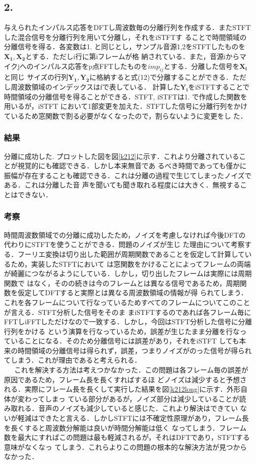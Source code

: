 \documentclass[a4j]{jarticle}
\begin{document}
\subsection{2.}
与えられたインパルス応答をDFTし周波数毎の分離行列を作成する．またSTFTした混合信号を分離行列を用いて分離し，それをiSTFTす
ることで時間領域の分離信号を得る．各変数は1. と同じとし，サンプル音源1,2をSTFTしたものを$\bm{X_1}, \bm{X_2}$とする．ただしi行に第iフレームが格
納されている．また，音源iからマイクjへのインパルス応答をp点FFTしたものを$imp_{ij}$とする．分離した信号を$\bm{X_i}$と同じ
サイズの行列$\bm{Y_1}, \bm{Y_2}$に格納すると式(12)で分離することができる．ただし周波数領域のインデックスはfで表している．
計算した$\bm{Y_i}$をiSTFTすることで時間領域の分離信号を得ることができる．STFT, iSTFTは1. で作成した関数を用いるが，iSTFT
において1部変更を加えた．STFTした信号に分離行列をかけているため窓関数で割る必要がなくなったので，割らないように変更をし
た．
\subsubsection{結果}
分離に成功した. プロットした図を図\ref{k212}に示す．これより分離されていることが視覚的にも確認できる．しかし本来無音であ
るべき時間であっても僅かに振幅が存在することも確認できる．これは分離の過程で生じてしまったノイズである．これは分離した音
声を聞いても聞き取れる程度には大きく．無視することはできない．
\subsubsection{考察}
時間周波数領域での分離に成功したため，ノイズを考慮しなければ今後DFTの代わりにSTFTを使うことができる．問題のノイズが生じ
た理由について考察する．フーリエ変換は切り出した範囲が周期関数であることを仮定して計算しているため，実装したSTFTにおいて
は窓関数をかけることによってフレームの両端が綺麗につながるようにしている．しかし，切り出したフレームは実際には周期関数で
はなく，そのの続きは今のフレームとは異なる信号であるため，周期関数を仮定してDFTすると実際とは異なる周波数領域の情報が得
られてしまう．これを各フレームについて行なっているためすべてのフレームについてこのことが言える．STFT分析した信号をそのま
まiSTFTするのであれば各フレーム毎にFFTしiFFTしただけなので一致する．しかし，今回はSTFT分析した信号に分離行列をかける
という演算を行なっているため，誤差が生じたまま分離を行なっていることになる．そのため分離信号には誤差があり，それをiSTFT
しても本来の時間領域の分離信号は得られず，誤差，つまりノイズがのった信号が得られてしまう．これが理由であると考えられる．
\\\ \ \ これを解決する方法は考えつかなかった．この問題は各フレーム毎の誤差が原因であるため，フレーム長を長くすればするほ
どノイズは減少すると予想される．実際にフレーム長を長くして実行した結果を図\ref{k212long}に示す．外形自体が変わってしまっ
ている部分があるが，ノイズ部分は減少していることが読み取れる．音声のノイズも減少していると感じた．これより解決はできてい
ないが軽減はできたと言える．しかしSTFTには不確定性原理があり，フレーム長を長くすると周波数分解能は良いが時間分解能は低く
なってしまう．フレーム数を最大にすればこの問題は最も軽減されるが，それはDFTであり，STFTする意味がなくなっ
てしまう．これらよりこの問題の根本的な解決方法が見つからなかった．
\end{document}
